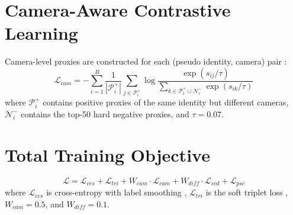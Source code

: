 \section{Camera-Aware Contrastive Learning}

Camera-level proxies are constructed for each (pseudo identity, camera) pair \cite{wang2021cap}:
\begin{equation}
    \mathcal{L}_{cam} = -\sum_{i=1}^{B} \frac{1}{|\mathcal{P}_i^+|} \sum_{j \in \mathcal{P}_i^+} \log \frac{\exp(s_{ij}/\tau)}{\sum_{k \in \mathcal{P}_i^+ \cup \mathcal{N}_i^-} \exp(s_{ik}/\tau)}
\end{equation}
where $\mathcal{P}_i^+$ contains positive proxies of the same identity but different cameras, $\mathcal{N}_i^-$ contains the top-50 hard negative proxies, and $\tau = 0.07$.

\section{Total Training Objective}

\begin{equation}
    \mathcal{L} = \mathcal{L}_{ces} + \mathcal{L}_{tri} + W_{cam} \cdot \mathcal{L}_{cam} + W_{diff} \cdot \mathcal{L}_{scd} + \mathcal{L}_{psc}
\end{equation}
where $\mathcal{L}_{ces}$ is cross-entropy with label smoothing \cite{szegedy2016rethinking}, $\mathcal{L}_{tri}$ is the soft triplet loss \cite{hermans2017triplet}, $W_{cam} = 0.5$, and $W_{diff} = 0.1$.
